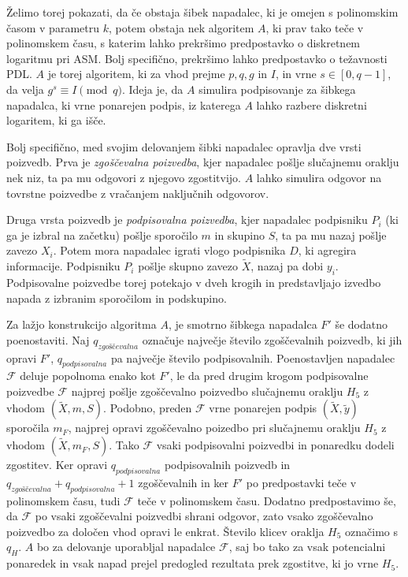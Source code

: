 \documentclass[isrm2, tisk]{fmfdelo}
\begin{document}
Želimo torej pokazati, da če obstaja šibek napadalec, ki je omejen s polinomskim časom v parametru
$k$, potem obstaja nek algoritem $A$, ki prav tako teče v polinomskem času, s katerim lahko prekršimo
predpostavko o diskretnem logaritmu pri ASM. Bolj specifično, prekršimo lahko predpostavko o
težavnosti PDL. $A$ je torej algoritem, ki za vhod prejme $p, q, g$ in $I$, in vrne $s \in [0, q - 1]$,
da velja $g^s \equiv I \pmod q$. Ideja je, da $A$ simulira podpisovanje za šibkega napadalca,
ki vrne ponarejen podpis, iz katerega $A$ lahko razbere diskretni logaritem, ki ga išče.

Bolj specifično, med svojim delovanjem šibki napadalec opravlja dve vrsti poizvedb. Prva je
\textit{zgoščevalna poizvedba}, kjer napadalec pošlje slučajnemu oraklju nek niz, ta pa mu odgovori
z njegovo zgostitvijo. $A$ lahko simulira odgovor na tovrstne poizvedbe z vračanjem naključnih odgovorov.

Druga vrsta poizvedb je \textit{podpisovalna poizvedba}, kjer napadalec podpisniku $P_i$ (ki ga je 
izbral na začetku) pošlje sporočilo $m$ in skupino $S$, ta pa mu nazaj pošlje zavezo $X_i$. Potem
mora napadalec igrati vlogo podpisnika $D$, ki agregira informacije. Podpisniku $P_i$ pošlje skupno
zavezo $\tilde{X}$, nazaj pa dobi $y_i$. Podpisovalne poizvedbe torej potekajo v dveh krogih in
predstavljajo izvedbo napada z izbranim sporočilom in podskupino.

Za lažjo konstrukcijo algoritma $A$, je smotrno šibkega napadalca $F'$ še dodatno poenostaviti. Naj
$q_{zgoščevalna}$ označuje največje število zgoščevalnih poizvedb, ki jih opravi $F'$, $q_{podpisovalna}$
pa največje število podpisovalnih. Poenostavljen napadalec $\mathcal{F}$ deluje popolnoma enako kot $F'$,
le da pred drugim krogom podpisovalne poizvedbe $\mathcal{F}$ najprej pošlje zgoščevalno poizvedbo slučajnemu
oraklju $H_5$ z vhodom $(\tilde{X}, m, S)$. Podobno, preden $\mathcal{F}$ vrne ponarejen podpis $(\tilde{X}, 
\tilde{y})$ sporočila $m_F$, najprej opravi zgoščevalno poizedbo pri slučajnemu oraklju $H_5$ z
vhodom $(\tilde{X}, m_F, S)$. Tako $\mathcal{F}$ vsaki podpisovalni poizvedbi in ponaredku dodeli
zgostitev. Ker opravi $q_{podpisovalna}$ podpisovalnih poizvedb in $q_{zgoščevalna} + q_{podpisovalna} + 1$
zgoščevalnih in ker $F'$ po predpostavki teče v polinomskem času, tudi $\mathcal{F}$ teče v
polinomskem času. Dodatno predpostavimo še, da $\mathcal{F}$ po vsaki zgoščevalni poizvedbi shrani
odgovor, zato vsako zgoščevalno poizvedbo za določen vhod opravi le enkrat. Število klicev oraklja
$H_5$ označimo s $q_H$. $A$ bo za delovanje uporabljal napadalce $\mathcal{F}$, saj bo tako za vsak
potencialni ponaredek in vsak napad prejel predogled rezultata prek zgostitve, ki jo vrne $H_5$.
\end{document}

